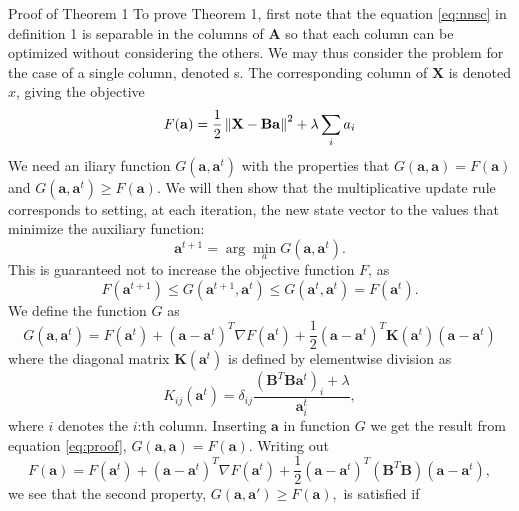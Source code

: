 \begin{proof2}{Proof of Theorem 1}
To prove Theorem 1, first note that the equation \ref{eq:nnsc} in definition 1 is separable in the columns of $\mathbf{A}$ so that each column can be optimized without considering the others. We may thus consider the problem for the case of a single column, denoted s. The corresponding column of $\mathbf{X}$ is denoted $x$, giving the objective
\begin{equation}
F(\mathbf{a}) = \frac{1}{2}\left\lVert\mathbf{X}-\mathbf{B}\mathbf{a}\right\rVert^2 + \lambda \sum_i a_i
\end{equation}
We need an iliary function $G(\mathbf{a},\mathbf{a}^t)$ with the properties that $G(\mathbf{a},\mathbf{a}) = F(\mathbf{a})$ and $G(\mathbf{a},\mathbf{a}^t) \geq F(\mathbf{a})$. We will then show that the multiplicative update rule corresponds to setting, at each iteration, the new state vector to the values that minimize the auxiliary function:
\begin{equation}
\mathbf{a}^{t+1} = \arg\!\min_{a} G(\mathbf{a},\mathbf{a}^t).
\end{equation}
This is guaranteed not to increase the objective function $F$, as
\begin{equation}
\label{eq:proof}
F(\mathbf{a}^{t+1}) \leq G(\mathbf{a}^{t+1},\mathbf{a}^t) \leq G(\mathbf{a}^t,\mathbf{a}^t) = F(\mathbf{a}^t).
\end{equation}
We define the function $G$ as
\begin{equation}
G(\mathbf{a},\mathbf{a}^t) = F(\mathbf{a}^t) + (\mathbf{a}-\mathbf{a}^t)^T \nabla F(\mathbf{a}^t) + \frac{1}{2} (\mathbf{a}-\mathbf{a}^t)^T\mathbf{K}(\mathbf{a}^t)(\mathbf{a}-\mathbf{a}^t)
\end{equation}
where the diagonal matrix $\mathbf{K}(\mathbf{a}^t)$ is defined by elementwise division as
\begin{equation}
K_{ij}(\mathbf{a}^t) = \delta_{ij}\frac{(\mathbf{B}^T\mathbf{B}\mathbf{a}^t)_i+\lambda}{\mathbf{a}^t_i},
\end{equation}
where $i$ denotes the $i$:th column. Inserting $\mathbf{a}$ in function $G$ we get the result from equation \ref{eq:proof}, $G(\mathbf{a},\mathbf{a}) = F(\mathbf{a})$. Writing out
\begin{equation}
F(\mathbf{a}) = F(\mathbf{a}^t) + (\mathbf{a}-\mathbf{a}^t)^T \nabla F(\mathbf{a}^t)+\frac{1}{2}(\mathbf{a}-\mathbf{a}^t)^T(\mathbf{B}^T\mathbf{B})(\mathbf{a}-\mathbf{a}^t),
\end{equation}
we see that the second property, $G(\mathbf{a},\mathbf{a}') \geq F(\mathbf{a}),$ is satisfied if

\end{proof2}
